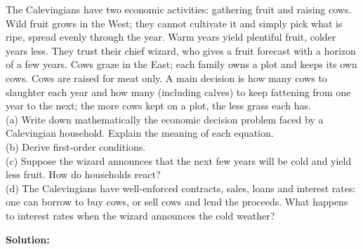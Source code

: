 \documentclass[12pt, letterpaper]{article}
\begin{document}
\begin{tcolorbox}[evenbox,title={Problem 9.10 \quad Wizards and Cows}]
\begin{tcolorbox}[questionbox]
The Calevingians have two economic activities: gathering fruit and raising cows. Wild fruit
grows in the West; they cannot cultivate it and simply pick what is ripe, spread evenly through
the year. Warm years yield plentiful fruit, colder years less. They trust their chief wizard,
who gives a fruit forecast with a horizon of a few years. Cows graze in the East; each family
owns a plot and keeps its own cows. Cows are raised for meat only. A main decision is how many
cows to slaughter each year and how many (including calves) to keep fattening from one year to
the next; the more cows kept on a plot, the less grass each has.\\[3pt]
(a) Write down mathematically the economic decision problem faced by a Calevingian household.
Explain the meaning of each equation.\\
(b) Derive first-order conditions.\\
(c) Suppose the wizard announces that the next few years will be cold and yield less fruit. How
do households react?\\
(d) The Calevingians have well-enforced contracts, sales, loans and interest rates: one can
borrow to buy cows, or sell cows and lend the proceeds. What happens to interest rates when the
wizard announces the cold weather?
\end{tcolorbox}

\textbf{Solution:}


\end{tcolorbox}
\end{document}
